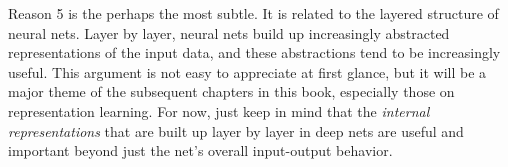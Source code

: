 Reason 5 is the perhaps the most subtle. It is related to the layered structure of neural nets. Layer by layer, neural nets build up increasingly abstracted representations of the input data, and these abstractions tend to be increasingly useful. This argument is not easy to appreciate at first glance, but it will be a major theme of the subsequent chapters in this book, especially those on representation learning. For now, just keep in mind that the \textit{internal representations} that are built up layer by layer in deep nets are useful and important beyond just the net's overall input-output behavior.








